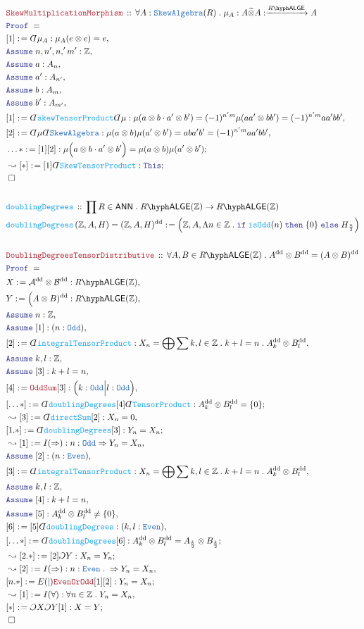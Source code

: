 \documentclass[12pt]{scrartcl}%
\newcommand{\TYPE}[1]{\textcolor{NavyBlue}{\mathtt{#1}}}%
\newcommand{\FUNC}[1]{\textcolor{Cerulean}{\mathtt{#1}}}%
\newcommand{\LOGIC}[1]{\textcolor{Blue}{\mathtt{#1}}}%
\newcommand{\THM}[1]{\textcolor{Maroon}{\mathtt{#1}}}%
\renewcommand{\.}{\; . \;} %
\newcommand{\de}{: \kern 0.1pc =} %
\newcommand{\If}{\LOGIC{if} \;} %
\newcommand{\Then}{ \; \LOGIC{then} \;} %
\newcommand{\Else}{\; \LOGIC{else} \;} %
\newcommand{\Act}[1]{\left( #1 \right)} %
\newcommand{\Theorem}[2]{& \THM{#1} \, :: \, #2 \\ & \Proof = \\ } %
\newcommand{\DeclareFunc}[2]{& \FUNC{#1} \, :: \, #2 \\}%
\newcommand{\DefineNamedFunc}[4]{&  \FUNC{#1}\Act{#2} = #3 \de #4 \\}%
\newcommand{\Page}[1]{ \begin{align*} #1 \end{align*}  }%
\newcommand{ \bd }{ \ByDef }%
\newcommand{\Int}{\mathbb{Z}}%
\newcommand{\Say}[3]{& #1 \de #2 : #3, \\} %
\newcommand{\Conclude}[3]{& #1 \de #2 : #3; \\}%
\newcommand{\Derive}[3]{& \leadsto #1 \de #2 : #3, \\} %
\newcommand{\DeriveConclude}[3]{& \leadsto #1 \de #2 : #3 ; \\} %
\newcommand{\Assume}[2]{& \LOGIC{Assume} \; #1 : #2, \\} %
\newcommand{\QED}{\; \square} %
\newcommand{\EndProof}{& \QED \\} %
\newcommand{\ByDef}{\rotatebox[origin=c]{-180}{$D$}}%
\newcommand{\ByConstr}{\rotatebox[origin=c]{-180}{$C$}}%
\newcommand{\Proof}{\LOGIC{Proof} \; } %
\newcommand{\Arrow}[1]{\xrightarrow{#1}}%
\newcommand{\A}{\mathcal{A}}
\newcommand{\B}{\mathcal{B}}
\newcommand{\ANN}{\mathsf{ANN}} %
\newcommand{\LALGE}[1]{#1\hyph\mathsf{ALGE}}%
\begin{document}
\Page{
	\Theorem{SkewMultiplicationMorphism}{\forall A : \TYPE{SkewAlgebra}(R) \. \mu_A : A \widetilde{\otimes} A : \Arrow{\LALGE{R}} A}
	\Say{[1]}{ \bd \mu_A  }{ \mu_A(e \otimes e) = e}
	\Assume{n,n',n,'m'}{\Int}
	\Assume{a}{A_n}
	\Assume{a'}{A_{n'}}
	\Assume{b}{A_{m}}
	\Assume{b'}{A_{m'}}
	\Say{[1]}{\bd \FUNC{skewTensorProduct}\bd\mu}{ 
		\mu(a \otimes b \cdot a' \otimes b') = 
		(-1)^{n'm}\mu(aa' \otimes bb') = 
		(-1)^{n'm} aa'bb'
	}
	\Say{[2]}{\bd\mu\bd \TYPE{SkewAlgebra}}{\mu(a \otimes b)\mu(a' \otimes b') =  aba'b' = (-1)^{n'm}aa'bb'}
	\Conclude{\ldots*}{[1][2]}{\mu\Big( a \otimes b \cdot a' \otimes b'\Big) = \mu(a \otimes b)\mu(a' \otimes b')}
	\DeriveConclude{[*]}{[1]\bd \FUNC{SkewTensorProduct}}{\LOGIC{This}}
	\EndProof
	\\
	\DeclareFunc{doublingDegrees}{\prod R \in \ANN \. \LALGE{R}(\Int) \to \LALGE{R}(\Int)}
	\DefineNamedFunc{doublingDegrees}{\Int,A,H}{(\Int,A,H)^{\mathrm{dd}}}{\Big(\Int,A,\Lambda n \in \Int \. \If \FUNC{isOdd}(n) \Then \{0\} \Else H_{\frac{n}{2}} \Big) } 
	\\
	\Theorem{DoublingDegreesTensorDistributive}{\forall A,B \in \LALGE{R}(\Int) \. A^{\mathrm{dd}} \otimes B^{\mathrm{dd}} = (A \otimes B)^{\mathrm{dd}} }
	\Say{X}{\A^{\mathrm{dd}} \otimes \B^{\mathrm{dd}}}{\LALGE{R}(\Int)}
	\Say{Y}{\Big(A \otimes B)^{\mathrm{dd}}}{\LALGE{R}(\Int)}
	\Assume{n}{\Int}
	\Assume{[1]}{(n : \TYPE{Odd})}
	\Say{[2]}{\bd \FUNC{integralTensorProduct}}{ X_n = \bigoplus \sum k,l \in \Int \. k + l = n \. A^{\mathrm{dd}}_k \otimes B^{\mathrm{dd}}_l }
	\Assume{k,l}{\Int}
	\Assume{[3]}{k + l = n}
	\Say{[4]}{\THM{OddSum}[3]}{\Big( k : \TYPE{Odd} \Big| l : \TYPE{Odd}\Big)}
	\Conclude{[\ldots*]}{\bd \FUNC{doublingDegrees}[4]\bd \FUNC{TensorProduct}}{ A^{\mathrm{dd}}_k \otimes B^\mathrm{dd}_l = \{0\} }
	\Derive{[3]}{\bd \FUNC{directSum}[2]}{X_n = 0}
	\Conclude{[1.*]}{\bd \FUNC{doublingDegrees}[3]}{Y_n = X_n}
	\Derive{[1]}{I(\Rightarrow)}{n : \TYPE{Odd} \Rightarrow Y_n = X_n}
	\Assume{[2]}{ (n : \TYPE{Even}) }
	\Say{[3]}{\bd \FUNC{integralTensorProduct}}{ X_n = \bigoplus \sum k,l \in \Int \. k + l = n \. A^{\mathrm{dd}}_k \otimes B^{\mathrm{dd}}_l }
	\Assume{k,l}{\Int}
	\Assume{[4]}{k + l = n}
	\Assume{[5]}{ A^{\mathrm{dd}}_k \otimes B^{\mathrm{dd}}_l \neq \{0\}}
	\Say{[6]}{[5]\bd \FUNC{doublingDegrees}}{(k,l : \TYPE{Even})}
	\Conclude{[\ldots*]}{\bd \FUNC{doublingDegrees}[6]}{ A^{\mathrm{dd}}_k \otimes B^{\mathrm{dd}}_l = A_{\frac{k}{2}} \otimes B_{\frac{k}{2}}  } 
	\DeriveConclude{[2.*]}{[2]\ByConstr Y}{ X_n = Y_n}
	\Derive{[2]}{I(\Rightarrow)}{n : \TYPE{Even} \. \Rightarrow Y_n = X_n}
	\Conclude{[n.*]}{E(|)\THM{EvenOrOdd}[1][2]}{Y_n = X_n}
	\Derive{[1]}{I(\forall)}{\forall n \in \Int \. Y_n = X_n}
	\Conclude{[*]}{\ByConstr X \ByConstr Y [1]}{X = Y}
	\EndProof
}
\newpage
\end{document}
